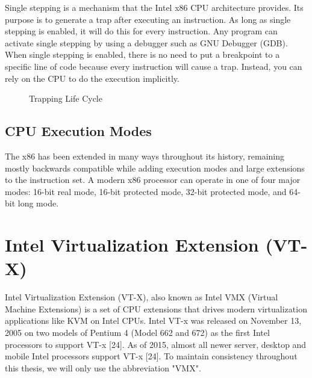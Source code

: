 \documentclass{report}
\begin{document}
\begin{spacing}{1.5}
Single stepping is a mechanism that the Intel x86 CPU architecture provides. Its purpose is to generate a trap after executing an instruction. As long as single stepping is enabled, it will do this for every instruction. Any program can activate single stepping by using a debugger such as GNU Debugger (GDB). When single stepping is enabled, there is no need to put a breakpoint to a specific line of code because every instruction will cause a trap. Instead, you can rely on the CPU to do the execution implicitly.


\begin{figure}[ht]
  \caption{Trapping Life Cycle}
\end{figure}


\subsection{CPU Execution Modes}

{\large
The x86 has been extended in many ways throughout its history, remaining mostly backwards compatible while adding execution modes and large extensions to the instruction set. A modern x86 processor can operate in one of four major modes: 16-bit real mode, 16-bit protected mode, 32-bit protected mode, and 64-bit long mode.
\newline
}
















\section{Intel Virtualization Extension (VT-X)}

{\large
Intel Virtualization Extension (VT-X), also known as Intel VMX (Virtual Machine Extensions) is a set of CPU extensions that drives modern virtualization applications like KVM on Intel CPUs. Intel VT-x was released on November 13, 2005 on two models of Pentium 4 (Model 662 and 672) as the first Intel processors to support VT-x [24]. As of 2015, almost all newer server, desktop and mobile Intel processors support VT-x [24]. To maintain consistency throughout this thesis, we will only use the abbreviation "VMX".
\newline
}



\end{spacing}
\end{document}

